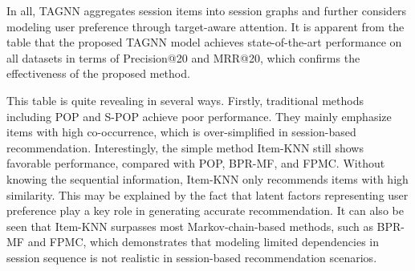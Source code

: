 \documentclass[sigconf]{acmart}
\begin{document}
\begin{table}
	\centering
	\small
	\caption{The performance of TAGNN compared with other baseline methods using two datasets.}
	\label{tab:result-baseline-algorithms}
\end{table}

In all, TAGNN aggregates session items into session graphs and further considers modeling user preference through target-aware attention. It is apparent from the table that the proposed TAGNN model achieves state-of-the-art performance on all datasets in terms of Precision@20 and MRR@20, which confirms the effectiveness of the proposed method.

This table is quite revealing in several ways. Firstly, traditional methods including POP and S-POP achieve poor performance. They mainly emphasize items with high co-occurrence, which is over-simplified in session-based recommendation. Interestingly, the simple method Item-KNN still shows favorable performance, compared with POP, BPR-MF, and FPMC. Without knowing the sequential information, Item-KNN only recommends items with high similarity. This may be explained by the fact that latent factors representing user preference play a key role in generating accurate recommendation. It can also be seen that Item-KNN surpasses most Markov-chain-based methods, such as BPR-MF and FPMC, which demonstrates that modeling limited dependencies in session sequence is not realistic in session-based recommendation scenarios.
\end{document}
